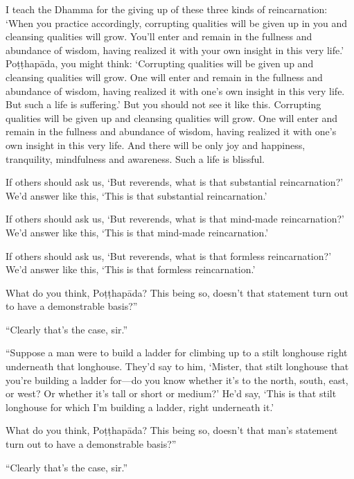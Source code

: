 \documentclass[12pt,openany]{book}%
\begin{document}
I teach the Dhamma for the giving up of these three kinds of reincarnation: ‘When you practice accordingly, corrupting qualities will be given up in you and cleansing qualities will grow. You’ll enter and remain in the fullness and abundance of wisdom, having realized it with your own insight in this very life.’ \textsanskrit{Poṭṭhapāda}, you might think: ‘Corrupting qualities will be given up and cleansing qualities will grow. One will enter and remain in the fullness and abundance of wisdom, having realized it with one’s own insight in this very life. But such a life is suffering.’ But you should not see it like this. Corrupting qualities will be given up and cleansing qualities will grow. One will enter and remain in the fullness and abundance of wisdom, having realized it with one’s own insight in this very life. And there will be only joy and happiness, tranquility, mindfulness and awareness. Such a life is blissful. 

If others should ask us, ‘But reverends, what is that substantial reincarnation?’ We’d answer like this, ‘This is that substantial reincarnation.’ 

If others should ask us, ‘But reverends, what is that mind-made reincarnation?’ We’d answer like this, ‘This is that mind-made reincarnation.’ 

If others should ask us, ‘But reverends, what is that formless reincarnation?’ We’d answer like this, ‘This is that formless reincarnation.’ 

What do you think, \textsanskrit{Poṭṭhapāda}? This being so, doesn’t that statement turn out to have a demonstrable basis?” 

“Clearly that’s the case, sir.” 

“Suppose a man were to build a ladder for climbing up to a stilt longhouse right underneath that longhouse. They’d say to him, ‘Mister, that stilt longhouse that you’re building a ladder for—do you know whether it’s to the north, south, east, or west? Or whether it’s tall or short or medium?’ He’d say, ‘This is that stilt longhouse for which I’m building a ladder, right underneath it.’ 

What do you think, \textsanskrit{Poṭṭhapāda}? This being so, doesn’t that man’s statement turn out to have a demonstrable basis?” 

“Clearly that’s the case, sir.” 
\end{document}
